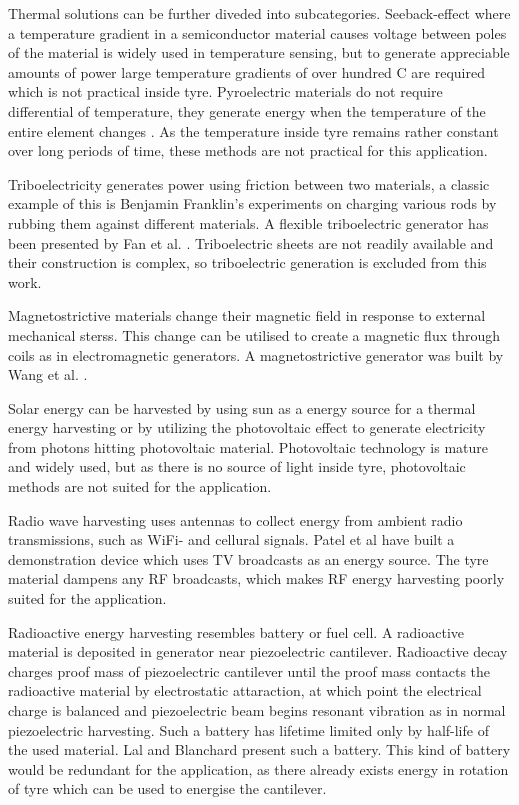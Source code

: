 Thermal solutions can be further diveded into subcategories. Seeback-effect where a temperature gradient in a semiconductor material causes voltage between poles of the material is widely used in temperature sensing, but to generate appreciable amounts of power large temperature gradients of over hundred \degree C are required \cite{Amatya2010} which is not practical inside tyre. Pyroelectric materials do not require differential of temperature, they generate energy when the temperature of the entire element changes \cite{Zhang2011}. As the temperature inside tyre remains rather constant over long periods of time, these methods are not practical for this application.

Triboelectricity generates power using friction between two materials, a classic example of this is Benjamin Franklin's experiments on charging various rods by rubbing them against different materials. A flexible triboelectric generator has been presented by Fan et al. \cite{Fan2012}. Triboelectric sheets are not readily available and their construction is complex, so triboelectric generation is excluded from this work. 

Magnetostrictive materials change their magnetic field in response to external mechanical sterss. This change can be utilised to create a magnetic flux through coils as in electromagnetic generators. A magnetostrictive generator was built by Wang et al. \cite{Wang2006}. 

Solar energy can be harvested by using sun as a energy source for a thermal energy harvesting or by utilizing the photovoltaic effect to generate electricity from photons hitting photovoltaic material. Photovoltaic technology is mature and widely used, but as there is no source of light inside tyre, photovoltaic methods are not suited for the application.

Radio wave harvesting uses antennas to collect energy from ambient radio transmissions, such as WiFi- and cellural signals. Patel et al \cite{Patel2014} have built a demonstration device which uses TV broadcasts as an energy source. The tyre material dampens any RF broadcasts, which makes RF energy harvesting poorly suited for the application.

Radioactive energy harvesting resembles battery or fuel cell. A radioactive material is deposited in generator near piezoelectric cantilever. Radioactive decay charges proof mass of piezoelectric cantilever until the proof mass contacts the radioactive material by electrostatic attaraction, at which point the electrical charge is balanced and piezoelectric beam begins resonant vibration as in normal piezoelectric harvesting. Such a battery has lifetime limited only by half-life of the used material. Lal and Blanchard \cite{Lal2004} present such a battery. This kind of battery would be redundant for the application, as there already exists energy in rotation of tyre which can be used to energise the cantilever. 

